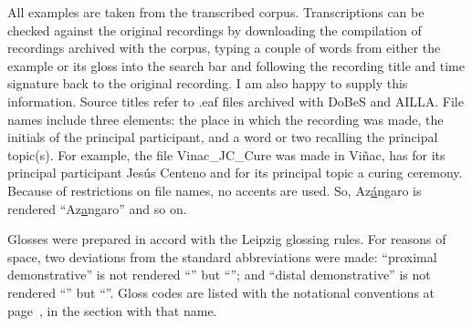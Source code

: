 All examples are taken from the transcribed corpus. Transcriptions can be checked against the original recordings by downloading the compilation of recordings archived with the corpus, typing a couple of words from either the example or its gloss into the search bar and following the recording title and time signature back to the original recording. I am also happy to supply this information. Source titles refer to \textrm{.eaf} files archived with DoBeS and AILLA. File names include three elements: the place in which the recording was made, the initials of the principal participant, and a word or two recalling the principal topic(s). For example, the file \textrm{Vinac\_JC\_Cure} was made in Viñac, has for its principal participant Jesús Centeno and for its principal topic a curing ceremony. Because of restrictions on file names, no accents are used. So, Az\underline{á}ngaro is rendered “Az\underline{a}ngaro” and so on.

Glosses were prepared in accord with the Leipzig glossing rules. For reasons of space, two deviations from the standard abbreviations were made: “proximal demonstrative” is not rendered “” but “”; and “distal demonstrative” is not rendered “” but “”. Gloss codes are listed with the notational conventions at page~\pageref{ch:notconv}, in the section with that name.
